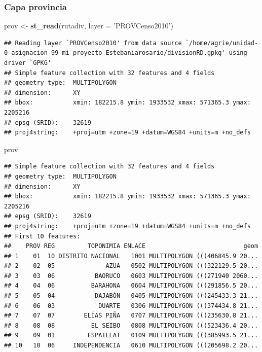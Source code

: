 \documentclass[11pt,]{article}
\newenvironment{Shaded}{\begin{snugshade}}{\end{snugshade}}
\newcommand{\KeywordTok}[1]{\textcolor[rgb]{0.13,0.29,0.53}{\textbf{#1}}}
\newcommand{\DataTypeTok}[1]{\textcolor[rgb]{0.13,0.29,0.53}{#1}}
\newcommand{\StringTok}[1]{\textcolor[rgb]{0.31,0.60,0.02}{#1}}
\newcommand{\NormalTok}[1]{#1}
\begin{document}
\subsubsection{Capa provincia}\label{capa-provincia}

\begin{Shaded}
\begin{Highlighting}[]
\NormalTok{prov <-}\StringTok{ }\KeywordTok{st_read}\NormalTok{(rutadiv, }\DataTypeTok{layer =} \StringTok{'PROVCenso2010'}\NormalTok{)}
\end{Highlighting}
\end{Shaded}

\begin{verbatim}
## Reading layer `PROVCenso2010' from data source `/home/agrie/unidad-0-asignacion-99-mi-proyecto-Estebaniarosario/divisionRD.gpkg' using driver `GPKG'
## Simple feature collection with 32 features and 4 fields
## geometry type:  MULTIPOLYGON
## dimension:      XY
## bbox:           xmin: 182215.8 ymin: 1933532 xmax: 571365.3 ymax: 2205216
## epsg (SRID):    32619
## proj4string:    +proj=utm +zone=19 +datum=WGS84 +units=m +no_defs
\end{verbatim}

\begin{Shaded}
\begin{Highlighting}[]
\NormalTok{prov}
\end{Highlighting}
\end{Shaded}

\begin{verbatim}
## Simple feature collection with 32 features and 4 fields
## geometry type:  MULTIPOLYGON
## dimension:      XY
## bbox:           xmin: 182215.8 ymin: 1933532 xmax: 571365.3 ymax: 2205216
## epsg (SRID):    32619
## proj4string:    +proj=utm +zone=19 +datum=WGS84 +units=m +no_defs
## First 10 features:
##    PROV REG         TOPONIMIA ENLACE                           geom
## 1    01  10 DISTRITO NACIONAL   1001 MULTIPOLYGON (((406845.9 20...
## 2    02  05              AZUA   0502 MULTIPOLYGON (((322129.5 20...
## 3    03  06           BAORUCO   0603 MULTIPOLYGON (((271940 2060...
## 4    04  06          BARAHONA   0604 MULTIPOLYGON (((291856.5 20...
## 5    05  04           DAJABÓN   0405 MULTIPOLYGON (((245433.3 21...
## 6    06  03            DUARTE   0306 MULTIPOLYGON (((374434.8 21...
## 7    07  07        ELÍAS PIÑA   0707 MULTIPOLYGON (((235630.8 21...
## 8    08  08          EL SEIBO   0808 MULTIPOLYGON (((523436.4 20...
## 9    09  01         ESPAILLAT   0109 MULTIPOLYGON (((385993.5 21...
## 10   10  06     INDEPENDENCIA   0610 MULTIPOLYGON (((205698.2 20...
\end{verbatim}
\end{document}
